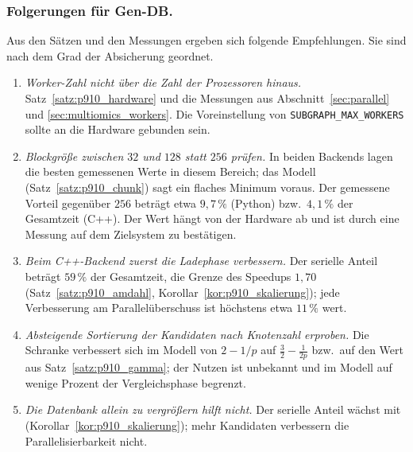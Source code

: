 \documentclass[a4paper,12pt, twoside]{report}
\theoremstyle{definition}
\begin{document}
\subsubsection{Folgerungen für Gen-DB.} Aus den Sätzen und den Messungen ergeben sich folgende Empfehlungen. Sie sind nach dem Grad der Absicherung geordnet.
\begin{enumerate}[label=(\arabic*)]
\item \emph{Worker-Zahl nicht über die Zahl der Prozessoren hinaus.} Satz~\ref{satz:p910_hardware} und die Messungen aus Abschnitt~\ref{sec:parallel} und \ref{sec:multiomics_workers}. Die Voreinstellung von \texttt{SUBGRAPH\_MAX\_WORKERS} sollte an die Hardware gebunden sein.
\item \emph{Blockgröße zwischen $32$ und $128$ statt $256$ prüfen.} In beiden Backends lagen die besten gemessenen Werte in diesem Bereich; das Modell (Satz~\ref{satz:p910_chunk}) sagt ein flaches Minimum voraus. Der gemessene Vorteil gegenüber $256$ beträgt etwa $9{,}7\,\%$ (Python) bzw.\ $4{,}1\,\%$ der Gesamtzeit (C++). Der Wert hängt von der Hardware ab und ist durch eine Messung auf dem Zielsystem zu bestätigen.
\item \emph{Beim C++-Backend zuerst die Ladephase verbessern.} Der serielle Anteil beträgt $59\,\%$ der Gesamtzeit, die Grenze des Speedups $1{,}70$ (Satz~\ref{satz:p910_amdahl}, Korollar~\ref{kor:p910_skalierung}); jede Verbesserung am Parallelüberschuss ist höchstens etwa $11\,\%$ wert.
\item \emph{Absteigende Sortierung der Kandidaten nach Knotenzahl erproben.} Die Schranke verbessert sich im Modell von $2-1/p$ auf $\tfrac32-\tfrac1{2p}$ bzw.\ auf den Wert aus Satz~\ref{satz:p910_gamma}; der Nutzen ist unbekannt und im Modell auf wenige Prozent der Vergleichsphase begrenzt.
\item \emph{Die Datenbank allein zu vergrößern hilft nicht.} Der serielle Anteil wächst mit (Korollar~\ref{kor:p910_skalierung}); mehr Kandidaten verbessern die Parallelisierbarkeit nicht.
\end{enumerate}
\end{document}
